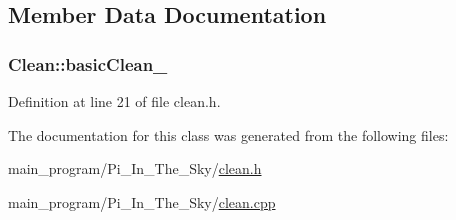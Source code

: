 \subsection{Member Data Documentation}
\subsubsection[{\texorpdfstring{basic\+Clean\+\_\+}{basicClean_}}]{ Clean\+::basic\+Clean\+\_\+\hspace{0.3cm}{\ttfamily [protected]}}\hypertarget{class_clean_ace2cc08f6555b450d4941d9f05cc337b}{}\label{class_clean_ace2cc08f6555b450d4941d9f05cc337b}


Definition at line 21 of file clean.\+h.



The documentation for this class was generated from the following files\+:\begin{DoxyCompactItemize}
\item 
main\+\_\+program/\+Pi\+\_\+\+In\+\_\+\+The\+\_\+\+Sky/\hyperlink{clean_8h}{clean.\+h}\item 
main\+\_\+program/\+Pi\+\_\+\+In\+\_\+\+The\+\_\+\+Sky/\hyperlink{clean_8cpp}{clean.\+cpp}\end{DoxyCompactItemize}
